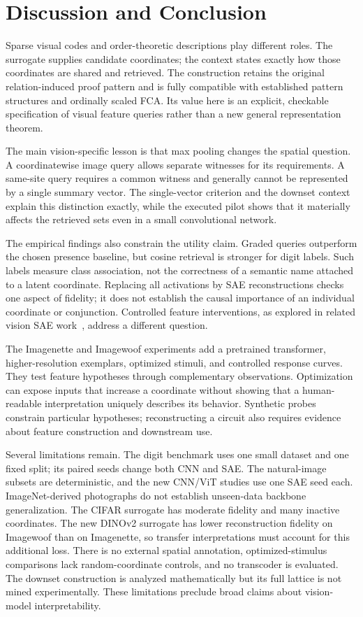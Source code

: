 \section{Discussion and Conclusion}\label{sec:discussion}
Sparse visual codes and order-theoretic descriptions play different
roles. The surrogate supplies candidate coordinates; the context states
exactly how those coordinates are shared and retrieved. The construction
retains the original relation-induced proof pattern and is fully
compatible with established pattern structures and ordinally scaled
FCA. Its value here is an explicit, checkable specification of visual
feature queries rather than a new general representation theorem.

The main vision-specific lesson is that max pooling changes the spatial
question. A coordinatewise image query allows separate witnesses for its
requirements. A same-site query requires a common witness and generally
cannot be represented by a single summary vector. The single-vector
criterion and the downset context explain this distinction exactly,
while the executed pilot shows that it materially affects the retrieved
sets even in a small convolutional network.

The empirical findings also constrain the utility claim. Graded queries
outperform the chosen presence baseline, but cosine retrieval is stronger
for digit labels. Such labels measure class association, not the
correctness of a semantic name attached to a latent coordinate. Replacing
all activations by SAE reconstructions checks one aspect of fidelity;
it does not establish the causal importance of an individual coordinate
or conjunction. Controlled feature interventions, as explored in related
vision SAE work~\cite{stevens2025vision}, address a different question.

The Imagenette and Imagewoof experiments add a pretrained transformer,
higher-resolution exemplars, optimized stimuli, and controlled response
curves. They test feature hypotheses through complementary observations.
Optimization can expose inputs that increase a coordinate without showing
that a human-readable interpretation uniquely describes its behavior.
Synthetic probes constrain particular hypotheses; reconstructing a circuit
also requires evidence about feature construction and downstream use.

Several limitations remain. The digit benchmark uses one small dataset
and one fixed split; its paired seeds change both CNN and SAE. The
natural-image subsets are deterministic, and the new CNN/ViT studies
use one SAE seed each. ImageNet-derived photographs do not establish
unseen-data backbone generalization. The CIFAR surrogate has moderate
fidelity and many inactive coordinates. The new DINOv2 surrogate has
lower reconstruction fidelity on Imagewoof than on Imagenette, so
transfer interpretations must account for this additional loss.
There is no external spatial annotation, optimized-stimulus comparisons
lack random-coordinate controls, and no transcoder is evaluated.
The downset construction is analyzed mathematically but its full lattice
is not mined experimentally. These limitations preclude broad claims
about vision-model interpretability.

